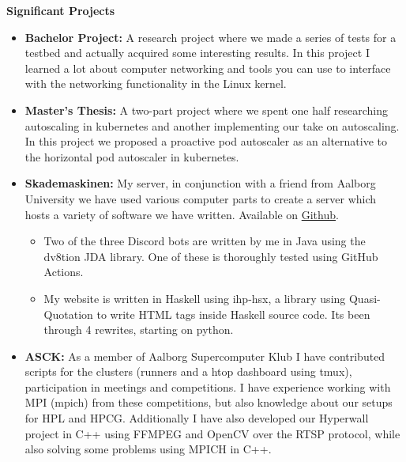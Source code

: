 \documentclass[a4paper, 14pt]{article}
\newcommand{\myitem}[1]{\item[\color{myorange}$\circ$]#1}
\newcommand{\newcvsection}[2]{
    \noindent\huge \textbf{#1} \color{myorange}\hrulefill\color{black}
    
    \normalsize
    #2    
    \vspace{.1cm}
}
\begin{document}
    \newcvsection{Significant Projects}{
        \begin{itemize}
            \myitem{
                \textbf{Bachelor Project: } A research project where we made a series of tests for a testbed and actually acquired some interesting results. 
                In this project I learned a lot about computer networking and tools you can use to interface with the networking functionality in the Linux kernel.
            }
            \myitem{
                \textbf{Master's Thesis: } A two-part project where we spent one half researching autoscaling in kubernetes and another implementing our take on autoscaling. In this project we proposed a proactive pod autoscaler as an alternative to the horizontal pod autoscaler in kubernetes.
            }
            \myitem{
                \textbf{Skademaskinen: } My server, in conjunction with a friend from Aalborg University we have used various computer parts to create a server which hosts a variety of software we have written.
                Available on \href{https://github.com/Skademaskinen}{Github}.
                \begin{itemize}
                    \myitem{
                        Two of the three Discord bots are written by me in Java using the dv8tion JDA library. One of these is thoroughly tested using GitHub Actions.
                    }
                    \myitem{
                        My website is written in Haskell using ihp-hsx, a library using Quasi-Quotation to write HTML tags inside Haskell source code. Its been through 4 rewrites, starting on python.
                    }
                \end{itemize}
            }

            \myitem{
                \textbf{ASCK: } As a member of Aalborg Supercomputer Klub I have contributed scripts for the clusters (runners and a htop dashboard using tmux), participation in meetings and competitions. 
                I have experience working with MPI (mpich) from these competitions, but also knowledge about our setups for HPL and HPCG.
                Additionally I have also developed our Hyperwall project in C++ using FFMPEG and OpenCV over the RTSP protocol, while also solving some problems using MPICH in C++.
            }
        \end{itemize}
    }
    
\end{document}

